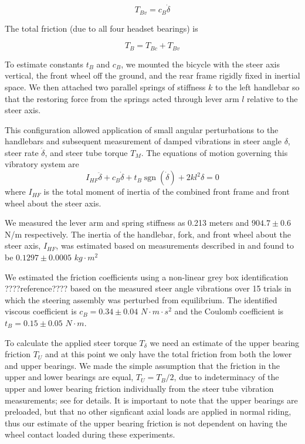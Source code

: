 \documentclass[10pt]{article}
\begin{document}
\begin{equation}
  \label{eq:viscous}
  T_{Bv} = c_B \dot{\delta}
\end{equation}

The total friction (due to all four headset bearings) is

\begin{equation}
  T_B = T_{Bc} + T_{Bv}
\end{equation}

To estimate constants $t_B$ and $c_B$, we mounted the bicycle with the
steer axis vertical, the front wheel off the ground, and the rear frame rigidly
fixed in inertial space. We then attached two parallel springs of stiffness $k$
to the left handlebar so that the restoring force from the springs acted through lever
arm $l$ relative to the steer axis.


This configuration allowed application of small angular perturbations to the handlebars
and subsequent measurement of damped vibrations in steer angle
$\delta$, steer rate $\dot{\delta}$, and steer tube torque $T_M$. The equations
of motion governing this vibratory system are 
%
\begin{equation}
  I_{HF} \ddot{\delta} + c_B \dot{\delta} + t_B
  \operatorname{sgn}(\dot{\delta}) + 2 k l^2 \delta = 0
\end{equation}
%
where $I_{HF}$ is the total moment of inertia of the combined front frame and
front wheel about the steer axis.

We measured the lever arm and spring stiffness as 0.213 meters and $904.7 \pm
0.6$ N/m respectively. The inertia of the handlebar, fork, and front wheel
about the steer axis, $I_{HF}$, was estimated based on measurements
described in \cite{Moore2012} and found to be $0.1297 \pm 0.0005$ $kg\cdot m^2$

We estimated the friction coefficients using a non-linear grey box
identification ????reference???? based on the measured steer angle vibrations over 15 trials in which the
steering assembly was perturbed from equilibrium. The identified viscous
coefficient is $c_B = 0.34 \pm 0.04$ $N \cdot m \cdot s^2$ and the Coulomb
coefficient is $t_B = 0.15 \pm 0.05$ $N \cdot m$.

To calculate the applied steer torque $T_\delta$ we need an estimate of the
upper bearing friction $T_U$ and at this point we only have the total friction
from both the lower and upper bearings. We made the simple assumption that the
friction in the upper and lower bearings are equal, $T_U = T_B / 2$, due to
indeterminacy of the upper and lower bearing friction individually from the
steer tube vibration measurements; see \cite{Moore2012} for details. It is
important to note that the upper bearings are preloaded, but that no other
signficant axial loads are applied in normal riding, thus our estimate of the
upper bearing friction is not dependent on having the wheel contact loaded
during these experiments.
\end{document}
